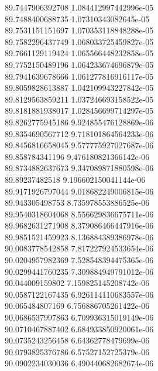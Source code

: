 {89.7447906392708 1.084412997442996e-05 \\
89.7488400688735 1.07310343082645e-05 \\
89.7531151151697 1.070353118848288e-05 \\
89.7582296437749 1.068033725459827e-05 \\
89.7661129119424 1.065566448232858e-05 \\
89.7752150489196 1.064233674696879e-05 \\
89.7941639678666 1.061277816916117e-05 \\
89.8059828613887 1.042109943227842e-05 \\
89.8129563859211 1.037246693158522e-05 \\
89.8181881938017 1.028456699714297e-05 \\
89.8262775945186 9.924855476128869e-06 \\
89.8354690567712 9.718101864564233e-06 \\
89.8456816658045 9.577775927027687e-06 \\
89.858784341196 9.476180821366142e-06 \\
89.8734882637673 9.347089871880598e-06 \\
89.89237482518 9.196602150041144e-06 \\
89.9171926797044 9.018682249006815e-06 \\
89.943305498753 8.735978553886525e-06 \\
89.9540318604068 8.556629836675711e-06 \\
89.9682631271908 8.379086466447916e-06 \\
89.9851521459923 8.136884389386978e-06 \\
90.0083778542858 7.817227924533654e-06 \\
90.0204957982369 7.528548394475365e-06 \\
90.0299441760235 7.309884949791012e-06 \\
90.044009159802 7.159825145208742e-06 \\
90.0587122167435 6.926114110683557e-06 \\
90.065484807169 6.756886705261422e-06 \\
90.0686537997863 6.709936315019149e-06 \\
90.0710467887402 6.684933850920061e-06 \\
90.0735243256458 6.64362778479699e-06 \\
90.0793825376786 6.57527152725379e-06 \\
90.0902234030036 6.490440682682674e-06 \\
}
